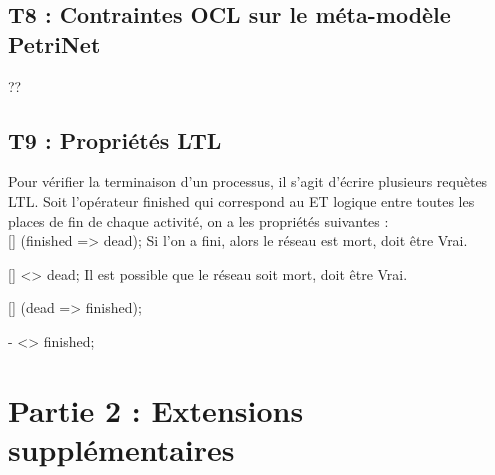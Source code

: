 \documentclass{report}
\begin{document}
\section{T8 : Contraintes OCL sur le méta-modèle PetriNet}
??

\section{T9 : Propriétés LTL}

Pour vérifier la terminaison d'un processus, il s'agit d'écrire plusieurs requètes LTL.
Soit l'opérateur finished qui correspond au ET logique entre toutes les places de fin de chaque activité, on a les propriétés suivantes :\\

[] (finished => dead);
Si l'on a fini, alors le réseau est mort, doit être Vrai.

[] <> dead;
Il est possible que le réseau soit mort, doit être Vrai.

[] (dead => finished);

- <> finished;

\chapter{Partie 2 : Extensions supplémentaires}


\end{document}
